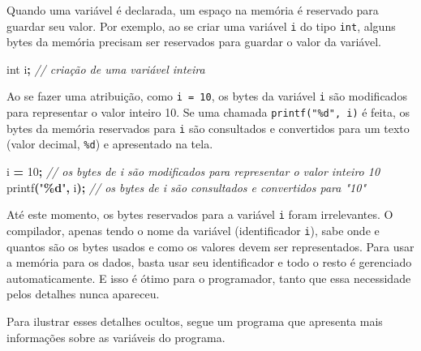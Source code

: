 \documentclass[
  11pt,
  a4paper,
]{scrbook}
\newenvironment{Shaded}{\begin{snugshade}}{\end{snugshade}}
\newcommand{\CommentTok}[1]{\textcolor[rgb]{0.56,0.35,0.01}{\textit{#1}}}
\newcommand{\DataTypeTok}[1]{\textcolor[rgb]{0.13,0.29,0.53}{#1}}
\newcommand{\DecValTok}[1]{\textcolor[rgb]{0.00,0.00,0.81}{#1}}
\newcommand{\NormalTok}[1]{#1}
\newcommand{\OperatorTok}[1]{\textcolor[rgb]{0.81,0.36,0.00}{\textbf{#1}}}
\newcommand{\SpecialCharTok}[1]{\textcolor[rgb]{0.81,0.36,0.00}{\textbf{#1}}}
\newcommand{\StringTok}[1]{\textcolor[rgb]{0.31,0.60,0.02}{#1}}
\begin{document}
Quando uma variável é declarada, um espaço na memória é reservado para
guardar seu valor. Por exemplo, ao se criar uma variável \texttt{i} do
tipo \texttt{int}, alguns bytes da memória precisam ser reservados para
guardar o valor da variável.

\begin{Shaded}
\begin{Highlighting}[]
\DataTypeTok{int}\NormalTok{ i}\OperatorTok{;}  \CommentTok{// criação de uma variável inteira}
\end{Highlighting}
\end{Shaded}

Ao se fazer uma atribuição, como \texttt{i\ =\ 10}, os bytes da variável
\texttt{i} são modificados para representar o valor inteiro 10. Se uma
chamada \texttt{printf("\%d",\ i)} é feita, os bytes da memória
reservados para \texttt{i} são consultados e convertidos para um texto
(valor decimal, \texttt{\%d}) e apresentado na tela.

\begin{Shaded}
\begin{Highlighting}[]
\NormalTok{i }\OperatorTok{=} \DecValTok{10}\OperatorTok{;}  \CommentTok{// os bytes de i são modificados para representar o valor inteiro 10}
\NormalTok{printf}\OperatorTok{(}\StringTok{"}\SpecialCharTok{\%d}\StringTok{"}\OperatorTok{,}\NormalTok{ i}\OperatorTok{);}  \CommentTok{// os bytes de i são consultados e convertidos para "10"}
\end{Highlighting}
\end{Shaded}

Até este momento, os bytes reservados para a variável \texttt{i} foram
irrelevantes. O compilador, apenas tendo o nome da variável
(identificador \texttt{i}), sabe onde e quantos são os bytes usados e
como os valores devem ser representados. Para usar a memória para os
dados, basta usar seu identificador e todo o resto é gerenciado
automaticamente. E isso é ótimo para o programador, tanto que essa
necessidade pelos detalhes nunca apareceu.

Para ilustrar esses detalhes ocultos, segue um programa que apresenta
mais informações sobre as variáveis do programa.
\end{document}
